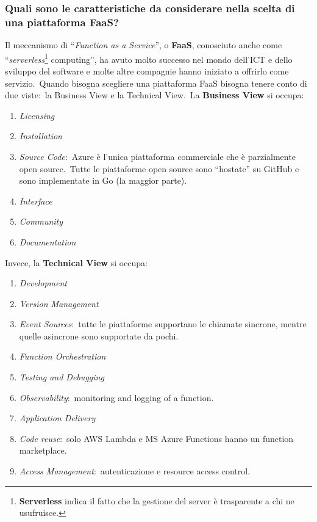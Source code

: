 \documentclass[12pt, a4paper]{article}
\begin{document}
\subsubsection*{Quali sono le caratteristiche da considerare nella scelta di una piattaforma FaaS?}
Il meccanismo di ``\textit{Function as a Service}'', o \textbf{FaaS}, conosciuto anche come ``\textit{serverless}\footnote{\textbf{Serverless} indica il fatto che la gestione del server è trasparente a chi ne usufruisce.} computing'', ha avuto molto successo nel mondo dell'ICT e dello sviluppo del software e molte altre compagnie hanno iniziato a offrirlo come servizio.\
Quando bisogna scegliere una piattaforma FaaS bisogna tenere conto di due viste:\ la Business View e la Technical View.\
La \textbf{Business View} si occupa:
\begin{enumerate}
	\item \textit{Licensing}
	\item \textit{Installation}
	\item \textit{Source Code}:\ Azure è l'unica piattaforma commerciale che è parzialmente open source.\ Tutte le piattaforme open source sono ``hostate'' su GitHub e sono implementate in Go (la maggior parte).
	\item \textit{Interface}
	\item \textit{Community}
	\item \textit{Documentation}
\end{enumerate}

\noindent Invece, la \textbf{Technical View} si occupa:
\begin{enumerate}
	\item \textit{Development}
	\item \textit{Version Management}
	\item \textit{Event Sources}:\ tutte le piattaforme supportano le chiamate sincrone, mentre quelle asincrone sono supportate da pochi.
	\item \textit{Function Orchestration}
	\item \textit{Testing and Debugging}
	\item \textit{Observability}:\ monitoring and logging of a function.
	\item \textit{Application Delivery}
	\item \textit{Code reuse}:\ solo AWS Lambda e MS Azure Functions hanno un function marketplace.
	\item \textit{Access Management}:\ autenticazione e resource access control.
\end{enumerate}
\end{document}
